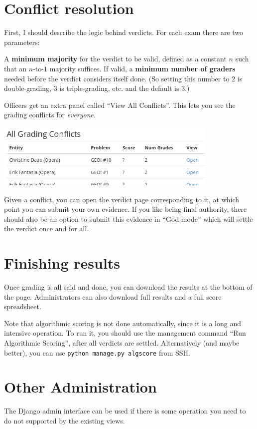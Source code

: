 \section{Conflict resolution}
First, I should describe the logic behind verdicts.
For each exam there are two parameters:
\begin{itemize}
	\ii A \textbf{minimum majority} for the verdict to be valid,
	defined as a constant $n$ such that an $n$-to-$1$ majority suffices.
	\ii If valid, a \textbf{minimum number of graders} needed before
	the verdict considers itself done.
	(So setting this number to $2$ is double-grading,
	$3$ is triple-grading, etc. and the default is $3$.)
\end{itemize}

Officers get an extra panel called ``View All Conflicts''.
This lets you see the grading conflicts for \emph{everyone}.

\begin{center}
	\includegraphics[width=0.8\textwidth]{images/all-conflict.png}
\end{center}

Given a conflict, you can open the verdict page corresponding to it,
at which point you can submit your own evidence.
If you like being final authority,
there should also be an option to submit this evidence in ``God mode''
which will settle the verdict once and for all.
\section{Finishing results}
Once grading is all said and done,
you can download the results at the bottom of the page.
Administrators can also download full results
and a full score spreadsheet.

Note that algorithmic scoring is not done automatically,
since it is a long and intensive operation.
To run it, you should use the management command
``Run Algorithmic Scoring'',
after all verdicts are settled.
Alternatively (and maybe better), you can use
\verb+python manage.py algscore+ from SSH.

\section{Other Administration}
The Django admin interface can be used if there
is some operation you need to do not supported by the existing views.

